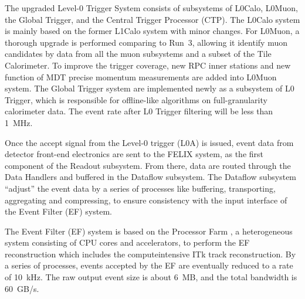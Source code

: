 The upgraded Level-0 Trigger System consists of subsystems of L0Calo, L0Muon, the Global Trigger, and the Central Trigger Processor (CTP). The L0Calo system is mainly based on the former L1Calo system with minor changes. For L0Muon, a thorough upgrade is performed comparing to Run~3, allowing it identify muon candidates by data from all the muon subsystems and a subset of the Tile Calorimeter. To improve the trigger coverage, new RPC inner stations and new function of MDT precise momentum measurements are added into L0Muon system. The Global Trigger system are implemented newly as a subsystem of L0 Trigger, which is responsible for offline-like algorithms on full-granularity calorimeter data. The event rate after L0 Trigger filtering will be less than 1~MHz.

Once the accept signal from the Level-0 trigger (L0A) is issued, event data from detector front-end electronics are sent to the FELIX system, as the first component of the Readout subsystem. From there, data are routed through the Data Handlers and buffered in the Dataflow subsystem. The Dataflow subsystem ``adjust'' the event data by a series of processes like buffering, transporting, aggregating and compressing, to ensure consistency with the input interface of the Event Filter (EF) system.

The Event Filter (EF) system is based on the Processor Farm \cite{TDAQ_TDR_EF}, a heterogeneous system consisting of CPU cores and accelerators, to perform the EF reconstruction which includes the computeintensive ITk track reconstruction. By a series of processes, events accepted by the EF are eventually reduced to a rate of 10~kHz. The raw output event size is about 6~MB, and the total bandwidth is 60~GB/s.

